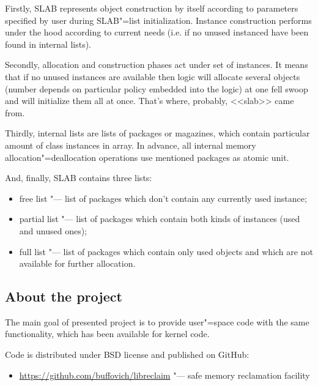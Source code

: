 \documentclass[10pt, a5paper]{article}
\begin{document}
Firstly, SLAB represents object construction by itself according to parameters specified by user during SLAB"=list initialization. Instance construction performs under the hood according to current needs (i.e. if no unused instanced have been found in internal lists).

Secondly, allocation and construction phases act under set of \linebreak instances. It means that if no unused instances are available then logic will allocate several objects (number depends on particular policy \linebreak embedded into the logic) at one fell swoop and will initialize them all at once. That's where, probably, <<slab>> came from.

Thirdly, internal lists are lists of packages or magazines, which contain particular amount of class instances in array. In advance, all internal memory allocation"=deallocation operations use mentioned \linebreak packages as atomic unit.

And, finally, SLAB contains three lists:

\begin{itemize}
  \item free list "--- list of packages which don't contain any currently used instance;
  \item partial list "--- list of packages which contain both kinds of instances (used and unused ones);
  \item full list "--- list of packages which contain only used objects and which are not available for further allocation.
\end{itemize}

\subsection*{About the project}

The main goal of presented project is to provide user"=space code with the same functionality, which has been available for kernel code.

Code is distributed under  BSD license and published on GitHub:

\begin{itemize}
  \item \url{https://github.com/buffovich/libreclaim} "--- safe memory \linebreak reclamation facility
\end{itemize}
\end{document}
